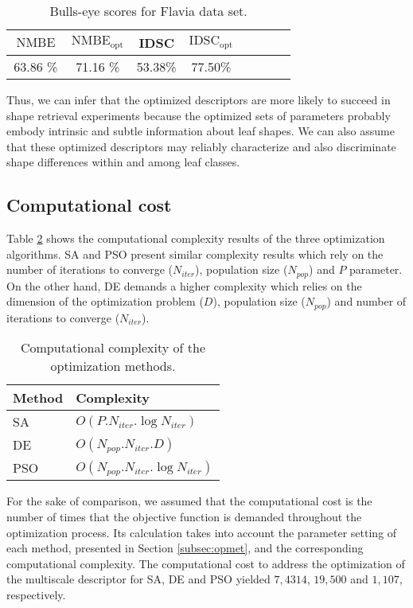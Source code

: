 \begin{table}[h!]
\centering
\caption{Bulls-eye scores for Flavia data set.}
\label{table_bull_eyes_leaves}
  \begin{tabular}{cccccccc}
  \toprule[1.5pt]
 $\operatorname{NMBE}$ & $\operatorname{NMBE_{opt}}$ & IDSC    & $\operatorname{IDSC_{opt}}$\\ \midrule
     63.86 \%  & 71.16 \%  & 53.38\%    & 77.50\%       \\
  \bottomrule[1.5pt]
  \end{tabular}
\end{table}

Thus, we can infer that the optimized descriptors are more likely to succeed in shape retrieval experiments because the optimized sets of parameters probably embody intrinsic and subtle information about leaf shapes. We can also assume that these optimized descriptors may reliably characterize and also discriminate shape differences within and among leaf classes. 

\subsection{Computational cost \label{sec:comp_cost}}

Table \ref{tbl:complexity} shows the computational complexity results of the three optimization algorithms. SA and PSO present similar complexity results which rely on the number of iterations to converge ($N_{iter}$), population size ($N_{pop}$) and $P$ parameter. On the other hand,  DE  demands a higher complexity which relies on the dimension of the optimization problem ($D$), population size ($N_{pop}$) and number of iterations to converge ($N_{iter}$).

\begin{table}[h!]
\centering
\caption{Computational complexity of the optimization methods.}
\label{tbl:complexity}
  \begin{tabular}{ll}
  \toprule[1.5pt]
 Method & Complexity\\
 \midrule
   SA  & $O(P.N_{iter}.\log{N_{iter}})$    \\
   DE  & $O(N_{pop}.N_{iter}.D)$   \\
   PSO&  $O(N_{pop}.N_{iter}.\log{N_{iter}})$\\
  \bottomrule[1.5pt]
  \end{tabular}
\end{table}

For the sake of comparison, we assumed that the computational cost is the number of times that the objective function is demanded throughout the optimization process. Its calculation takes into account the parameter setting of each method, presented in Section \ref{subsec:opmet}, and the corresponding computational complexity.  The computational cost to address the optimization of the multiscale descriptor for SA, DE and PSO yielded $7,4314$, $19,500$ and $1,107$, respectively. 

